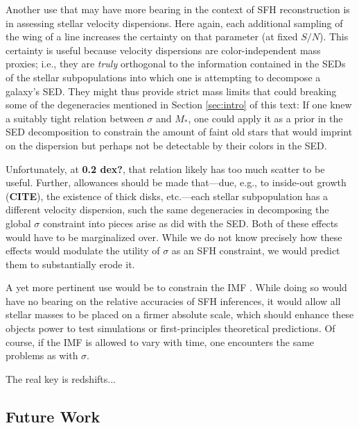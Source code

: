 \documentclass[a4paper,fleqn,usenatbib]{mnras}
\newcommand{\Mstel}{M_\ast}
\newcommand{\bfr}{\bf\color{red}}
\newcommand{\CITE}{{\bfr CITE}}
\begin{document}
Another use that may have more bearing in the context of SFH reconstruction is in assessing
stellar velocity dispersions. Here again, each additional sampling of the wing of a line increases
the certainty on that parameter (at fixed $S/N$). This certainty is useful because velocity dispersions 
are color-independent mass proxies; i.e., they are {\it truly} orthogonal to the information contained 
in the SEDs of the stellar subpopulations into which one is attempting to decompose a galaxy's SED.
They might thus provide strict mass limits that could breaking some of the degeneracies mentioned
in Section \ref{sec:intro} of this text: If one knew a suitably tight relation between $\sigma$
and $\Mstel$, one could apply it as a prior in the SED decomposition to constrain the
amount of faint old stars that would imprint on the dispersion but perhaps not be detectable
by their colors in the SED.

Unfortunately, at {\bfr 0.2 dex?}, that relation likely has too much scatter to be useful. Further,
allowances should be made that---due, e.g., to inside-out growth (\CITE), the existence of thick disks, 
etc.---each stellar subpopulation has a different velocity dispersion, such the same degeneracies in
decomposing the global $\sigma$ constraint into pieces arise as did with the SED. Both of these 
effects would have to be marginalized over. While we do not know precisely how these effects 
would modulate the utility of $\sigma$ as an SFH constraint, we would predict them to 
substantially erode it.

A yet more pertinent use would be to constrain the IMF \citep{Conroy12}. While doing so 
would have no bearing on the relative accuracies of SFH inferences, it would allow all stellar 
masses to be placed on a firmer absolute scale, which should enhance these objects power to test 
simulations or first-principles theoretical predictions. Of course, if the IMF is allowed to vary with 
time, one encounters the same problems as with $\sigma$.

The real key is redshifts...

\subsection{Future Work}
\label{sec:future}

\end{document}
